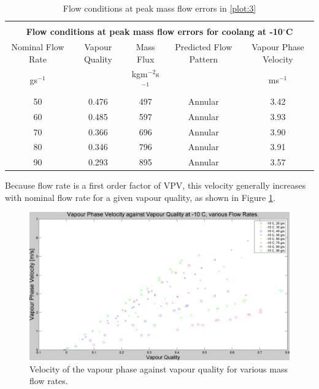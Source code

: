 \documentclass{report}
\begin{document}
\begin{table}
\begin{tabular}{|c|c|c|c|c|}
\hline\\
\multicolumn{5}{|c|}{\textbf{Flow conditions at peak mass flow errors for coolang at -10$^\circ$C}}\\\hline
Nominal Flow Rate & Vapour Quality & Mass Flux & Predicted Flow Pattern & Vapour Phase Velocity \\\hline
gs$^{-1}$ &  & kgm$^{-2}$s$^{-1}$ & & ms$^{-1}$\\\hline
50 &0.476 & 497 & Annular & 3.42 \\\hline
60 &0.485 & 597 & Annular & 3.93 \\\hline
70 &0.366 & 696 & Annular & 3.90 \\\hline
80 &0.346 & 796 & Annular & 3.91 \\\hline
90 &0.293 & 895 & Annular & 3.57 \\\hline
\end{tabular}
\caption{Flow conditions at peak mass flow errors in \ref{plot:3}}
\label{tab:flowConditions}
\end{table}
Because flow rate is a first order factor of VPV, this velocity generally increases with nominal flow rate for a given vapour quality, as shown in Figure \ref{gasVelocity}.
\begin{figure}
\includegraphics[width=\textwidth]{plots/fig12}
\caption{Velocity of the vapour phase against vapour quality for various mass flow rates.}
\label{gasVelocity}
\end{figure}

\FloatBarrier
\end{document}
